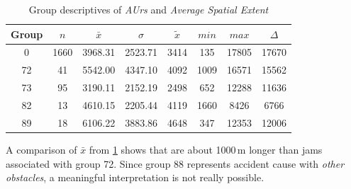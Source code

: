 \begin{table}[ht!]
	\small
	\centering
	\begin{tabular}{c|c|c|c|c|c|c|c}
		\toprule
		Group & $n$ & $\bar{x}$ & $\sigma$ & $\tilde{x}$ & $min$ & $max$ & $\Delta$ \\ 
		\midrule
		0  & 1660 & 3968.31 & 2523.71 & 3414 & 135  & 17805 & 17670 \\ 
		72 & 41   & 5542.00 & 4347.10 & 4092 & 1009 & 16571 & 15562 \\ 
		73 & 95   & 3190.11 & 2152.19 & 2498 & 652  & 12288 & 11636 \\ 
		82 & 13   & 4610.15 & 2205.44 & 4119 & 1660 & 8426  & 6766  \\ 
		89 & 18   & 6106.22 & 3883.86 & 4648 & 347  & 12353 & 12006 \\ 
		\bottomrule
	\end{tabular}
	\caption{Group descriptives of \textit{AUrs} and \textit{Average Spatial Extent}}
	\label{tbl:descriptives_baysis_matched_AUrs_SAvg}
\end{table}
A comparison of $\bar{x}$ from \cref{tbl:descriptives_baysis_matched_AUrs_SAvg} shows that are about 1000\,m longer than jams associated with group 72. Since group 88 represents accident cause with \textit{other obstacles}, a meaningful interpretation is not really possible. 

